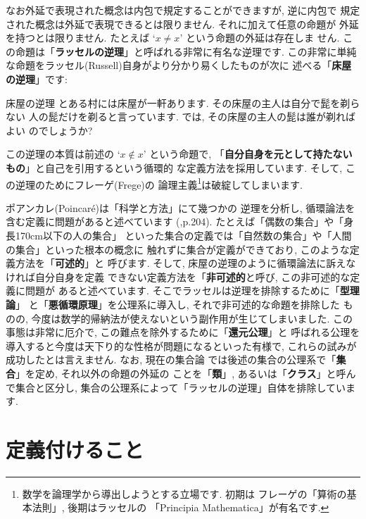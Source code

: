 \documentclass[b5j,8pt,twocolumn]{ltjsarticle}
\begin{document}
なお外延で表現された概念は内包で規定することができますが, 逆に内包で
規定された概念は外延で表現できるとは限りません. それに加えて任意の命題が
外延を持つとは限りません. たとえば `$x \neq x$' という命題の外延は存在しま
せん. この命題は「\textbf{ラッセルの逆理}」と呼ばれる非常に有名な逆理です.
 この非常に単純な命題をラッセル(Russell)自身がより分かり易くしたものが次に
述べる「\textbf{床屋の逆理}」です:

\begin{itembox}[c]{{床屋の逆理}}
\quad とある村には床屋が一軒あります. その床屋の主人は自分で髭を剃らない
人の髭だけを剃ると言っています. では, その床屋の主人の髭は誰が剃ればよい
のでしょうか?
\end{itembox}

この逆理の本質は前述の `$x \notin x$' という命題で, 
「\textbf{自分自身を元として持たないもの}」と自己を引用するという循環的
な定義方法を採用しています. そして, この逆理のためにフレーゲ(Frege)の
論理主義\footnote{数学を論理学から導出しようとする立場です. 初期は
フレーゲの「算術の基本法則」\cite{フレーゲ}, 後期はラッセルの
「Principia Mathematica」\cite{Russell}が有名です.}は破綻してしまいます.
\newline


ポアンカレ(Poincar\'e)は「科学と方法」\cite{ポアンカレ}にて幾つかの
逆理を分析し, 循環論法を含む定義に問題があると述べています
(\cite{ポアンカレ},p.204). たとえば「偶数の集合」や「身長170cm以下の人の集合」
といった集合の定義では「自然数の集合」や「人間の集合」といった根本の概念に
触れずに集合が定義ができており, このような定義方法を「\textbf{可述的}」と
呼びます. そして, 床屋の逆理のように循環論法に訴えなければ自分自身を定義
できない定義方法を「\textbf{非可述的}と呼び, この非可述的な定義に問題が
あると述べています. そこでラッセルは逆理を排除するために「\textbf{型理論}」
と「\textbf{悪循環原理}」を公理系に導入し, それで非可述的な命題を排除した
ものの, 今度は数学的帰納法が使えないという副作用が生じてしまいました.
 この事態は非常に厄介で, この難点を除外するために「\textbf{還元公理}」と
呼ばれる公理を導入すると今度は天下り的な性格が問題になるといった有様で,
 これらの試みが成功したとは言えません\cite{Russell}. なお, 現在の集合論
では後述の集合の公理系で「\textbf{集合}」を定め, それ以外の命題の外延の
ことを「\textbf{類}」, あるいは「\textbf{クラス}」と呼んで集合と区分し,
 集合の公理系によって「ラッセルの逆理」自体を排除しています.

\section{定義付けること}
\end{document}
